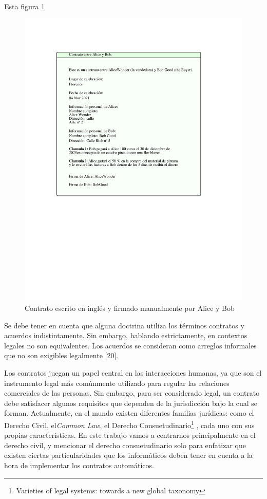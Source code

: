 \documentclass[12pt]{report} %
\begin{document}
\begin{itemize}
Esta figura \ref{cuadrocontratos1}

\begin{figure}
\centering
\includegraphics[width=0.85\columnwidth]{imagenes/cuadrocontratos1.pdf}
\caption{Contrato escrito en inglés y firmado manualmente por Alice y Bob}
\label{cuadrocontratos1}
\end{figure} 

Se debe tener en cuenta que alguna doctrina utiliza los términos contratos y acuerdos indistintamente. Sin embargo, hablando estrictamente, en contextos legales no son equivalentes. Los acuerdos se consideran como arreglos informales que no son  exigibles legalmente [20].

Los contratos juegan un papel central en las interacciones humanas, ya que son el instrumento legal más comúnmente utilizado para regular las relaciones comerciales de las personas. Sin embargo, para ser considerado legal, un contrato debe satisfacer algunos requisitos que dependen de la jurisdicción bajo la cual se forman. Actualmente, en el mundo existen diferentes familias jurídicas: como el Derecho Civil, el\textit{Common Law}, el Derecho Consuetudinario\footnote{\cite{Mathias2016}Varieties of legal systems: towards a new global taxonomy} , cada uno con sus propias características. En este trabajo vamos a centrarnos principalmente en el derecho civil, y mencionar el derecho consuetudinario solo para enfatizar que existen ciertas particularidades que los informáticos deben tener en cuenta a la hora de implementar los contratos automáticos.


\end{itemize}
\end{document}
